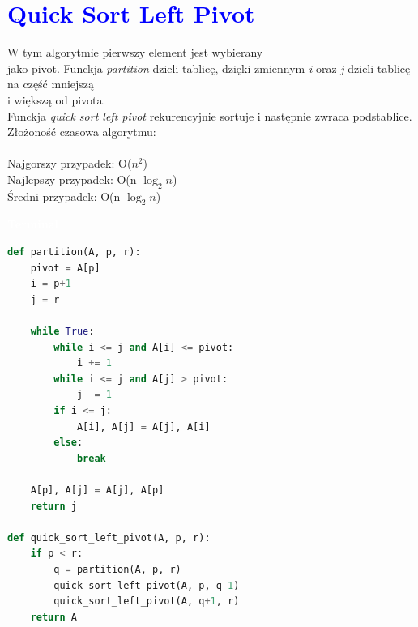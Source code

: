\documentclass{article}
\begin{document}
	\newpage
	
	\section*{\textcolor{blue}{Quick Sort Left Pivot}}
	\begin{multicols}{2}
		\noindent W tym algorytmie pierwszy element jest wybierany \\jako pivot. Funckja \textit{partition} dzieli tablicę, dzięki zmiennym \textit{i} oraz \textit{j} dzieli tablicę na część mniejszą \\i większą od pivota. \\Funckja \textit{quick sort left pivot} rekurencyjnie sortuje i następnie zwraca podstablice.\\
		Złożoność czasowa algorytmu: \\ \\Najgorszy przypadek: O($n^2$) \\Najlepszy przypadek: O(n $\log_2 n$) \\ Średni przypadek: O(n $\log_2 n$)
		
		\noindent 
		\begin{tcolorbox}[colback=black,colframe=gray!50!,arc=3mm,boxrule=0pt,left=0pt,right=0pt,width=\linewidth]
			\textcolor{white}{\textbf{\textsf{Terminal}}}\\
			
			\begin{lstlisting}[language=Python]
def partition(A, p, r):
	pivot = A[p]
	i = p+1
	j = r

	while True:
		while i <= j and A[i] <= pivot:
			i += 1
		while i <= j and A[j] > pivot:
			j -= 1
		if i <= j:
			A[i], A[j] = A[j], A[i]
		else:
			break

	A[p], A[j] = A[j], A[p]
	return j

def quick_sort_left_pivot(A, p, r):
	if p < r:
		q = partition(A, p, r)
		quick_sort_left_pivot(A, p, q-1)
		quick_sort_left_pivot(A, q+1, r)
	return A
			\end{lstlisting}
			
		\end{tcolorbox}
	\end{multicols}
	
	\newpage
	
\end{document}
